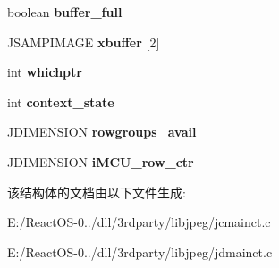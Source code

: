 \begin{DoxyCompactItemize}
\mbox{\label{structmy__main__controller_a6cd3c916b4d87c97f6fda7daa0816256}} 
boolean {\bfseries buffer\+\_\+full}
\item 
\mbox{\label{structmy__main__controller_a29fc35521c04489fdb6b7a7e758fb82a}} 
J\+S\+A\+M\+P\+I\+M\+A\+GE {\bfseries xbuffer} \mbox{[}2\mbox{]}
\item 
\mbox{\label{structmy__main__controller_a9838025ca47813221e8c208ad26bb9e8}} 
int {\bfseries whichptr}
\item 
\mbox{\label{structmy__main__controller_abc90e17934b16420478e95a8875918ae}} 
int {\bfseries context\+\_\+state}
\item 
\mbox{\label{structmy__main__controller_a8fdc8a382fc0be7922e5913b16cbf7dc}} 
J\+D\+I\+M\+E\+N\+S\+I\+ON {\bfseries rowgroups\+\_\+avail}
\item 
\mbox{\label{structmy__main__controller_a01c8f176e423a5d8e37637fa8210b236}} 
J\+D\+I\+M\+E\+N\+S\+I\+ON {\bfseries i\+M\+C\+U\+\_\+row\+\_\+ctr}
\end{DoxyCompactItemize}


该结构体的文档由以下文件生成\+:\begin{DoxyCompactItemize}
\item 
E\+:/\+React\+O\+S-\/0../dll/3rdparty/libjpeg/jcmainct.\+c\item 
E\+:/\+React\+O\+S-\/0../dll/3rdparty/libjpeg/jdmainct.\+c\end{DoxyCompactItemize}
